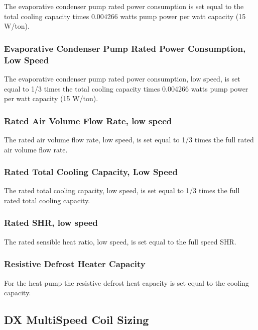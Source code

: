 The evaporative condenser pump rated power consumption is set equal to the total cooling capacity times 0.004266 watts pump power per watt capacity (15 W/ton).

\subsubsection{Evaporative Condenser Pump Rated Power Consumption, Low Speed}\label{evaporative-condenser-pump-rated-power-consumption-low-speed}

The evaporative condenser pump rated power consumption, low speed, is set equal to 1/3 times the total cooling capacity times 0.004266 watts pump power per watt capacity (15 W/ton).

\subsubsection{Rated Air Volume Flow Rate, low speed}\label{rated-air-volume-flow-rate-low-speed}

The rated air volume flow rate, low speed, is set equal to 1/3 times the full rated air volume flow rate.

\subsubsection{Rated Total Cooling Capacity, Low Speed}\label{rated-total-cooling-capacity-low-speed}

The rated total cooling capacity, low speed, is set equal to 1/3 times the full rated total cooling capacity.

\subsubsection{Rated SHR, low speed}\label{rated-shr-low-speed}

The rated sensible heat ratio, low speed, is set equal to the full speed SHR.

\subsubsection{Resistive Defrost Heater Capacity}\label{resistive-defrost-heater-capacity}

For the heat pump the resistive defrost heat capacity is set equal to the cooling capacity.

\subsection{DX MultiSpeed Coil Sizing}\label{dx-multispeed-coil-sizing}

